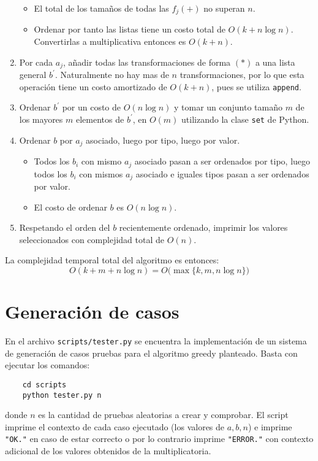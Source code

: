 \documentclass{article}
\theoremstyle{default}
\begin{document}
\begin{enumerate}
\begin{itemize}
			\item El total de los tamaños de todas las $f_j(+)$ no superan $n$.
			\item Ordenar por tanto las listas tiene un costo total de $O(k + n\log n)$. Convertirlas a multiplicativa entonces es $O(k + n)$.
		\end{itemize}
%
		\item Por cada $a_j$, añadir todas las transformaciones de forma $(*)$ a una lista general $b^\prime$. Naturalmente no hay mas de $n$ transformaciones, por lo que esta operación tiene un costo amortizado de $O(k + n)$, pues se utiliza \texttt{append}.
%
		\item Ordenar $b^\prime$ por un costo de $O(n\log n)$ y tomar un conjunto tamaño $m$ de los mayores $m$ elementos de $b^\prime$, en $O(m)$ utilizando la clase \texttt{set} de Python.
		
		\item Ordenar $b$ por $a_j$ asociado, luego por tipo, luego por valor.
		\begin{itemize}
			\item Todos los $b_i$ con mismo $a_j$ asociado pasan a ser ordenados por tipo, luego todos los $b_i$ con mismos $a_j$ asociado e iguales tipos pasan a ser ordenados por valor.
			\item El costo de ordenar $b$ es $O(n\log n)$.
		\end{itemize}
%
		\item Respetando el orden del $b$ recientemente ordenado, imprimir los valores seleccionados con complejidad total de $O(n)$.
	\end{enumerate}
%
	La complejidad temporal total del algoritmo es entonces:
	\begin{equation*}
		O(k + m + n\log n) = O\big(\max\big\{ k, m, n \log n \big\}\big)
	\end{equation*}
%
%
%
\section{Generación de casos}
En el archivo \texttt{scripts/tester.py} se encuentra la implementación de un sistema de generación de casos pruebas para el algoritmo greedy planteado. Basta con ejecutar los comandos:
\begin{verbatim}
    cd scripts
    python tester.py n
\end{verbatim}
donde $n$ es la cantidad de pruebas aleatorias a crear y comprobar. El script imprime el contexto de cada caso ejecutado (los valores de $a,b,n$) e imprime \texttt{"OK."} en caso de estar correcto o por lo contrario imprime \texttt{"ERROR."} con contexto adicional de los valores obtenidos de la multiplicatoria.
%
\end{document}
